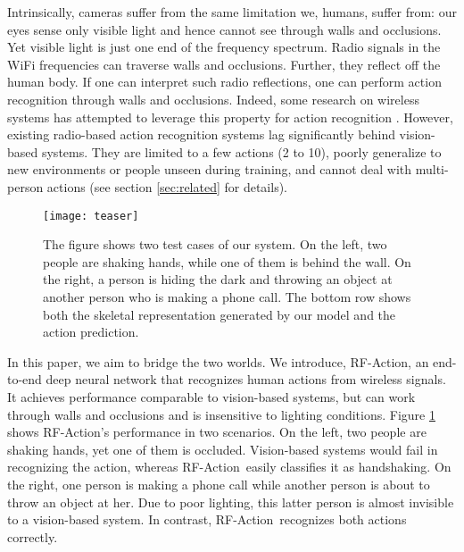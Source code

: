 \documentclass[10pt,twocolumn,letterpaper]{article}
\newcommand{\name} {RF-Action}
\begin{document}
Intrinsically, cameras suffer from the same limitation we, humans, suffer from: our eyes sense only visible light and hence cannot see through walls and occlusions. Yet visible light is just one end of the frequency spectrum. Radio signals in the WiFi frequencies can traverse walls and occlusions. Further, they reflect off the human body. If one can interpret such radio reflections, one can perform action recognition through walls and occlusions. Indeed, 
some research on wireless systems  has attempted to leverage this property for action recognition \cite{tian2018rf,yang2011activity,kasteren2010activity,abdelnasser2015wigest,wang2014eyes}. However, existing radio-based action recognition systems lag significantly behind vision-based systems. They are limited to a few actions (2 to 10),  poorly generalize to new environments or people unseen during training, and cannot deal with multi-person actions (see section \ref{sec:related} for details).

\begin{figure}[t]
    \centering
    \texttt{[image: teaser]}

\caption{\footnotesize{The figure shows two test cases of our system. On the left, two people are shaking hands, while one of them is behind the wall.  On the right, a person is hiding the dark and throwing an object at another person who is making a phone call. The bottom row shows both the skeletal representation generated by our model and the action prediction. }}    \label{fig:teaser}
\vspace{-10pt}
\end{figure}



In this paper, we aim to bridge the two worlds. We introduce, \name, an end-to-end deep neural network that recognizes human actions from wireless signals. It achieves performance comparable to vision-based systems, but can work through walls and occlusions and is insensitive to lighting conditions. Figure \ref{fig:teaser} shows \name's performance in two scenarios. On the left, two people are shaking hands, yet one of them is occluded.  Vision-based systems would fail in recognizing the action, whereas \name\ easily classifies it as handshaking. On the right, one person is making a phone call while another person is about to throw an object at her. Due to poor lighting, this latter person is almost invisible to a vision-based system. In contrast, \name\ recognizes both actions correctly. 
\end{document}
